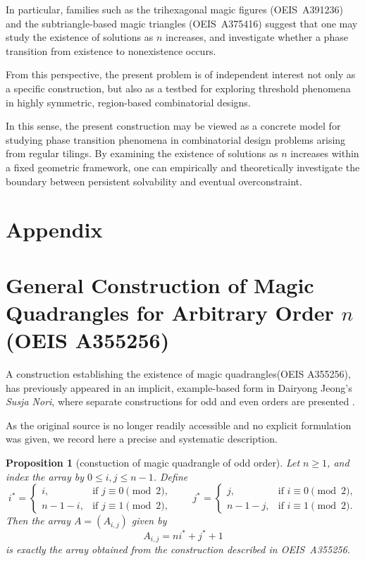 \documentclass[11pt]{article}
\theoremstyle{plain}
\newtheorem{proposition}[theorem]{Proposition}
\theoremstyle{definition}
\begin{document}
In particular, families such as the trihexagonal magic figures
(OEIS~A391236) and the subtriangle-based magic triangles
(OEIS~A375416) suggest that one may study the existence of solutions as
$n$ increases, and investigate whether a phase transition from existence
to nonexistence occurs.

From this perspective, the present problem is of independent interest not
only as a specific construction, but also as a testbed for exploring
threshold phenomena in highly symmetric, region-based combinatorial
designs.

In this sense, the present construction may be viewed as a concrete model
for studying phase transition phenomena in combinatorial design problems
arising from regular tilings. By examining the existence of solutions as
$n$ increases within a fixed geometric framework, one can empirically and
theoretically investigate the boundary between persistent solvability and
eventual overconstraint.

\appendix

\section*{Appendix}

\section{General Construction of Magic Quadrangles for Arbitrary Order \(n\) (OEIS A355256)}

A construction establishing the existence of magic quadrangles(OEIS A355256),\cite{OEISA355256,JeongQuadrangle}  has previously appeared in an implicit, example-based form in Dairyong Jeong's \textit{Susja Nori}\cite{JeongSite}, where separate constructions for odd and even orders are presented \cite{JeongOdd,JeongEven}.


As the original source is no longer readily accessible and no explicit formulation was given, we record here a precise and systematic description.


\begin{proposition}[constuction of magic quadrangle of odd order]
Let $n \ge 1$, and index the array by $0 \le i,j \le n-1$. Define
\[
i^* =
\begin{cases}
i, & \text{if } j \equiv 0 \pmod{2},\\
n-1-i, & \text{if } j \equiv 1 \pmod{2},
\end{cases}
\qquad
j^* =
\begin{cases}
j, & \text{if } i \equiv 0 \pmod{2},\\
n-1-j, & \text{if } i \equiv 1 \pmod{2}.
\end{cases}
\]
Then the array $A=(A_{i,j})$ given by
\[
A_{i,j} = n i^* + j^* + 1
\]
is exactly the array obtained from the construction described in OEIS~A355256.
\end{proposition}
\end{document}
